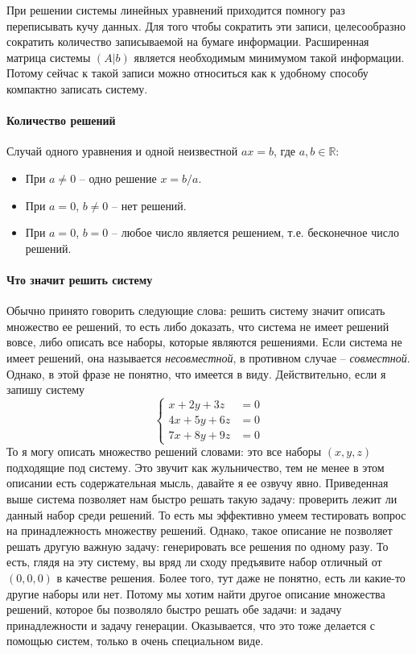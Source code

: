 При решении системы линейных уравнений приходится помногу раз переписывать кучу данных. Для того чтобы сократить эти записи, целесообразно сократить количество записываемой на бумаге информации.
Расширенная матрица системы $(A|b)$ является необходимым минимумом такой информации.
Потому сейчас к такой записи можно относиться как к удобному способу компактно записать систему.

\paragraph{Количество решений}

Случай одного уравнения и одной неизвестной $ax = b$, где $a, b\in \mathbb R$:
\begin{itemize}
\item При $a\neq 0$ -- одно решение $x = b/a$.

\item При $a = 0$, $b\neq 0$ -- нет решений.

\item При $a = 0$, $b = 0$ -- любое число является решением, т.е. бесконечное число решений.
\end{itemize}

\paragraph{Что значит решить систему}

Обычно принято говорить следующие слова: решить систему значит описать множество ее решений, то есть либо доказать, что система не имеет решений вовсе, либо описать все наборы, которые являются решениями.
Если система не имеет решений, она называется {\it несовместной}, в противном случае -- {\it совместной}.
Однако, в этой фразе не понятно, что имеется в виду.
Действительно, если я запишу систему
\[
\left\{
\begin{aligned}
x + 2 y + 3z &= 0\\
4x + 5y + 6z &= 0\\
7x + 8y + 9z &= 0
\end{aligned}
\right.
\]
То я могу описать множество решений словами: это все наборы $(x, y, z)$ подходящие под систему.
Это звучит как жульничество, тем не менее в этом описании есть содержательная мысль, давайте я ее озвучу явно.
Приведенная выше система позволяет нам быстро решать такую задачу: проверить лежит ли данный набор среди решений.
То есть мы эффективно умеем тестировать вопрос на принадлежность множеству решений.
Однако, такое описание не позволяет решать другую важную задачу: генерировать все решения по одному разу.
То есть, глядя на эту систему, вы вряд ли сходу предъявите набор отличный от $(0, 0, 0)$ в качестве решения.
Более того, тут даже не понятно, есть ли какие-то другие наборы или нет.
Потому мы хотим найти другое описание множества решений, которое бы позволяло быстро решать обе задачи: и задачу принадлежности и задачу генерации.
Оказывается, что это тоже делается с помощью систем, только в очень специальном виде.


